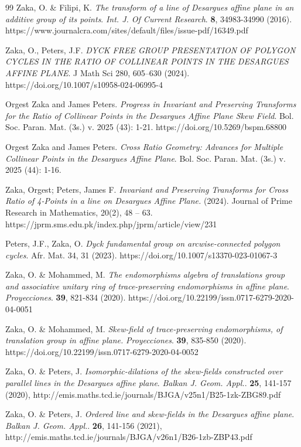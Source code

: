 \documentclass{amsart}
\theoremstyle{plain}
\numberwithin{equation}{section}
\begin{document}
\begin{thebibliography}{99}
 Zaka, O. \& Filipi, K. {\it The transform of a line of Desargues affine plane in an additive group of its points}. {\em Int. J. Of Current Research}. \textbf{8}, 34983-34990 (2016). https://www.journalcra.com/sites/default/files/issue-pdf/16349.pdf

 Zaka, O., Peters, J.F. {\it DYCK FREE GROUP PRESENTATION OF POLYGON CYCLES IN THE RATIO OF COLLINEAR POINTS IN THE DESARGUES AFFINE PLANE}. J Math Sci 280, 605–630 (2024). https://doi.org/10.1007/s10958-024-06995-4

 Orgest Zaka and James Peters. {\it Progress in Invariant and Preserving Transforms for the Ratio of Collinear Points in the Desargues Affine Plane Skew Field}.  Bol. Soc. Paran. Mat. (3s.) v. 2025 (43): 1-21.
https://doi.org/10.5269/bspm.68800

 Orgest Zaka and James Peters. {\it Cross Ratio Geometry: Advances for Multiple Collinear Points in the Desargues Affine Plane}.  Bol. Soc. Paran. Mat. (3s.) v. 2025 (44): 1-16.


  Zaka, Orgest; Peters, James F. {\it Invariant and Preserving Transforms for Cross Ratio of 4-Points in a line on Desargues Affine Plane.} (2024). Journal of Prime Research in Mathematics, 20(2), 48 – 63. https://jprm.sms.edu.pk/index.php/jprm/article/view/231

 Peters, J.F., Zaka, O. {\it Dyck fundamental group on arcwise-connected polygon cycles}. Afr. Mat. 34, 31 (2023). https://doi.org/10.1007/s13370-023-01067-3

 Zaka, O. \& Mohammed, M. {\it The endomorphisms algebra of translations group and associative unitary ring of trace-preserving endomorphisms in affine plane}. {\em Proyecciones}. \textbf{39}, 821-834 (2020). https://doi.org/10.22199/issn.0717-6279-2020-04-0051

 Zaka, O. \& Mohammed, M. {\it Skew-field of trace-preserving endomorphisms, of translation group in affine plane.} {\em Proyecciones}. \textbf{39}, 835-850 (2020). https://doi.org/10.22199/issn.0717-6279-2020-04-0052

 Zaka, O. \& Peters, J. {\it Isomorphic-dilations of the skew-fields constructed over parallel lines in the Desargues affine plane}. {\em Balkan J. Geom. Appl.}. \textbf{25}, 141-157 (2020), http://emis.maths.tcd.ie/journals/BJGA/v25n1/B25-1zk-ZBG89.pdf

 Zaka, O. \& Peters, J. {\it Ordered line and skew-fields in the Desargues affine plane}. {\em Balkan J. Geom. Appl.}. \textbf{26}, 141-156 (2021), http://emis.maths.tcd.ie/journals/BJGA/v26n1/B26-1zb-ZBP43.pdf

\end{thebibliography}
\end{document}
